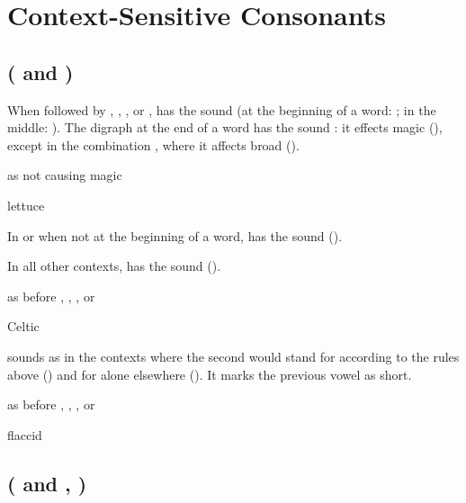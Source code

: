 \section{Context-Sensitive Consonants}

\subsection{ ( and )}

When followed by , , , or ,  has the sound 
(at the beginning of a word: ; in the
middle: ). The digraph  at the end of a
word has the sound : it effects magic  (),
except in the combination , where it affects broad  ().

\begin{exceptions}{ as  not causing magic }
\item lettuce
\end{exceptions}

In  or  when not at the beginning of a word,  has the
sound  ().

In all other contexts,  has the sound  ().

\begin{exceptions}{ as  before , , , or }
\item Celtic
\end{exceptions}

 sounds as  in the contexts where the second  would stand
for  according to the rules above () and for 
alone elsewhere (). It marks the previous vowel as short.

\begin{exceptions}{ as  before , , , or }
\item flaccid
\end{exceptions}

\subsection{ ( and , )}

